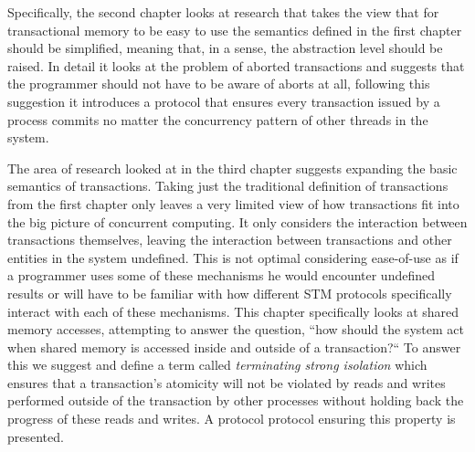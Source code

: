 Specifically, the second chapter looks at research that takes the view that for transactional memory to
be easy to use the semantics defined in the first chapter should be simplified, meaning that,
in a sense, the abstraction level should be raised.
In detail it looks at the problem of aborted transactions and suggests that
the programmer should not have to be aware of aborts at all, following this suggestion it introduces a protocol
that ensures every transaction issued by a process commits no matter the concurrency pattern
of other threads in the system.

The area of research looked at in the third chapter suggests expanding the basic semantics of transactions.
Taking just the traditional definition of transactions from the first chapter only leaves a very limited view of how
transactions fit into the big picture of concurrent computing.
It only considers the interaction between transactions themselves,
leaving the interaction between
transactions and other entities in the system undefined.
This is not optimal considering ease-of-use as if a programmer uses
some of these mechanisms he would encounter undefined results or will have
to be familiar with how different STM protocols specifically interact with 
each of these mechanisms.
This chapter specifically looks at shared memory accesses, attempting to answer the question, ``how should the system act when shared memory
is accessed inside and outside of a transaction?``
To answer this we suggest and define a term called \emph{terminating strong isolation} which ensures
that a transaction's atomicity will not be violated by reads and writes performed
outside of the transaction by other processes without holding back the progress of
these reads and writes.
A protocol protocol ensuring this property is presented.


